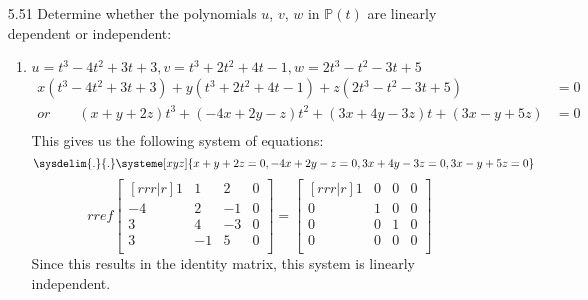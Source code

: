 \documentclass[12pt]{article}
\begin{document}
\begin{enumerate}
\item[5.51] Determine whether the polynomials $u$, $v$, $w$ in $\mathbb{P}(t)$ are linearly dependent or independent:
	\begin{enumerate}
	\item $u=t^3-4t^2+3t+3,v=t^3+2t^2+4t-1,w=2t^3-t^2-3t+5$
		\begin{align*}
		x(t^3-4t^2+3t+3)+y(t^3+2t^2+4t-1)+z(2t^3-t^2-3t+5) &= 0\\
		or \qquad (x+y+2z)t^3+(-4x+2y-z)t^2+(3x+4y-3z)t+(3x-y+5z) &= 0\\
		\end{align*}
		This gives us the following system of equations:
		\[ \sysdelim{.}{.}\systeme[xyz]{x+y+2z=0,-4x+2y-z=0,3x+4y-3z=0,3x-y+5z=0} \]
		\[ rref\begin{bmatrix}[rrr|r]1&1&2&0\\-4&2&-1&0\\3&4&-3&0\\3&-1&5&0\\\end{bmatrix} = \begin{bmatrix}[rrr|r]1&0&0&0\\0&1&0&0\\0&0&1&0\\0&0&0&0\\\end{bmatrix} \]
		Since this results in the identity matrix, this system is linearly independent.
	\end{enumerate}
	

\end{enumerate}
\end{document}
